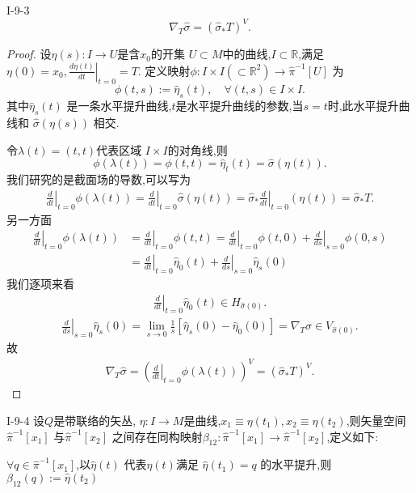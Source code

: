 \documentclass[../main.tex]{subfiles}
\begin{document}
 \begin{theorem}
   {}{I-9-3}\[
  \nabla_T \hat{\sigma} = (\hat{\sigma}_* T)^V 
   .\] 
\end{theorem}
\begin{proof}
  设$\eta(s):I \to U$是含$x_0$的开集 $U \subset M$中的曲线,$I \subset \mathbb{R}$,满足$\eta(0) = x_0, \left.\frac{d \eta(t)}{dt}\right|_{t = 0}  = T$. 定义映射$\phi : I \times I (\subset \mathbb{R}^2) \to \hat{\pi}^{-1}[U]$ 为 \[
 \phi(t,s) := \hat{\eta}_s(t), \quad \forall (t,s) \in I\times I 
  .\] 
  其中$\hat{\eta}_s(t)$ 是一条水平提升曲线,$t$是水平提升曲线的参数,当$s = t$时,此水平提升曲线和 $\hat{\sigma}(\eta(s))$ 相交.

  令$\lambda(t) = (t,t)$代表区域 $I\times I$的对角线,则 \[
 \phi(\lambda(t)) = \phi(t,t) =  \hat{\eta}_t(t) = \hat{\sigma}(\eta(t))
  .\] 
  我们研究的是截面场的导数,可以写为
  \begin{align*}
    \left.\frac{d}{dt}\right|_{t = 0} \phi(\lambda(t)) = \left.\frac{d}{dt}\right|_{t = 0} \hat{\sigma}(\eta(t)) = \hat{\sigma}_{*} \left.\frac{d}{dt}\right|_{t = 0}(\eta(t)) = \hat{\sigma}_* T
  .\end{align*}
另一方面
\begin{align*}
  \left.\frac{d}{dt}\right|_{t = 0} \phi(\lambda(t)) &= \left.\frac{d}{dt}\right|_{t = 0} \phi(t,t) = \left.\frac{d}{dt}\right|_{t = 0}\phi(t,0) + \left.\frac{d}{d s}\right|_{s = 0} \phi(0,s)\\
                                                     & = \left.\frac{d}{dt}\right|_{t = 0}\hat{\eta}_{0}(t) + \left.\frac{d}{d s}\right|_{s = 0} \hat{\eta}_s(0)
\end{align*}
我们逐项来看
\begin{align*}
  \left.\frac{d}{dt}\right|_{t = 0}\hat{\eta}_{0}(t)  \in H_{\hat{\sigma}(0)} 
.\end{align*}
\begin{align*}
  \left.\frac{d}{d s}\right|_{s = 0} \hat{\eta}_s(0) = \lim_{s \to 0} \frac{1}{s}[\hat{\eta}_s(0) - \hat{\eta}_0(0)] = \nabla_T \hat{\sigma} \in V_{\hat{\sigma}(0)} 
.\end{align*}
故
\begin{align*}
 \nabla_T \hat{\sigma} = \left( \left.\frac{d}{dt}\right|_{t = 0} \phi(\lambda (t))  \right)^V = (\hat{\sigma}_* T)^V
.\end{align*}
\end{proof}
\begin{theorem}
  {}{I-9-4} 
  设$Q$是带联络的矢丛, $\eta:I \to M$是曲线,$x_1 \equiv \eta(t_1), x_2 \equiv \eta(t_2)$,则矢量空间 $\hat{\pi}^{-1}[x_1]$ 与$\hat{\pi}^{-1}[x_2]$ 之间存在同构映射$\beta_{12}: \hat{\pi}^{-1}[x_1] \to \hat{\pi}^{-1}[x_2]$,定义如下:
  \begin{center}
    $\forall q \in \hat{\pi}^{-1}[x_1]$,以$\hat{\eta}(t)$ 代表$\eta(t)$满足 $\hat{\eta}(t_1) = q $ 的水平提升,则$\beta_{12}(q) := \hat{\eta}(t_2)$ 
  \end{center}
\end{theorem}
\end{document}
